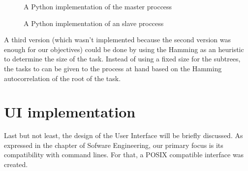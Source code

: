   \begin{figure}[ht!]
    \caption{A Python implementation of the master proccess}
    \label{parallelism_example:fig:1}
  \end{figure}

  \begin{figure}[ht!]
    \caption{A Python implementation of an slave proccess}
    \label{parallelism_example:fig:2}
  \end{figure}

  A third version (which wasn't implemented because the second version was
  enough for our objectives) could be done by using the Hamming as an
  heuristic to determine the size of the task. Instead of using a fixed size
  for the subtrees, the tasks to can be given to the process at hand based on the
  Hamming autocorrelation of the root of the task.\\

  \section{UI implementation}

  Last but not least, the design of the User Interface will be briefly discussed.
  As expressed in the chapter of Sofware Engineering, our primary focus is
  its compatibility with command lines. For that, a POSIX compatible
  interface was created.\\

